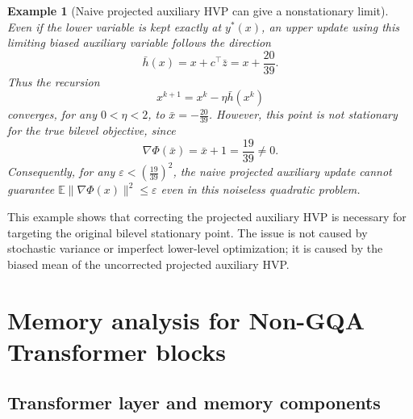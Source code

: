 \documentclass{pkumelon}
\theoremstyle{plain}
\newtheorem{example}{Example}
\newcommand{\E}{\mathbb{E}}
\begin{document}
\begin{example}[Naive projected auxiliary HVP can give a nonstationary limit]
Even if the lower variable is kept exactly at $y^*(x)$, an upper update using this limiting biased auxiliary variable follows the direction
\begin{equation*}
\bar h(x)=x+c^\top \bar z=x+\frac{20}{39}.
\end{equation*}
Thus the recursion
\begin{equation*}
x^{k+1}=x^k-\eta \bar h(x^k)
\end{equation*}
converges, for any $0<\eta<2$, to $\bar x=-\frac{20}{39}$. However, this point is not stationary for the true bilevel objective, since
\begin{equation*}
\nabla\Phi(\bar x)=\bar x+1=\frac{19}{39}\neq 0.
\end{equation*}
Consequently, for any $\varepsilon<\left(\frac{19}{39}\right)^2$, the naive projected auxiliary update cannot guarantee $\E\|\nabla\Phi(x)\|^2\le \varepsilon$ even in this noiseless quadratic problem.
\end{example}

This example shows that correcting the projected auxiliary HVP is necessary for targeting the original bilevel stationary point. The issue is not caused by stochastic variance or imperfect lower-level optimization; it is caused by the biased mean of the uncorrected projected auxiliary HVP.



\section{Memory analysis for Non-GQA Transformer blocks}
\label{sec:memory_compute_analysis}

\subsection{Transformer layer and memory components}
\label{subsec:memory_complexity_analysis}
\end{document}
